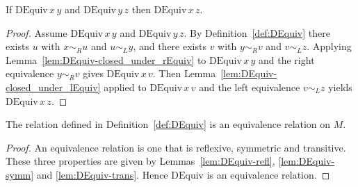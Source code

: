 \begin{lemma}
\label{lem:DEquiv-trans}
If \(\mathrm{DEquiv}\,x\,y\) and \(\mathrm{DEquiv}\,y\,z\) then \(\mathrm{DEquiv}\,x\,z\).
\leanok
{}
\end{lemma}
\begin{proof}
\leanok
Assume \(\mathrm{DEquiv}\,x\,y\) and \(\mathrm{DEquiv}\,y\,z\).  By Definition~\ref{def:DEquiv} there exists \(u\) with \(x \sim_R u\) and \(u \sim_L y\), and there exists \(v\) with \(y \sim_R v\) and \(v \sim_L z\).  Applying Lemma~\ref{lem:DEquiv-closed_under_rEquiv} to \(\mathrm{DEquiv}\,x\,y\) and the right equivalence \(y \sim_R v\) gives \(\mathrm{DEquiv}\,x\,v\).  Then Lemma~\ref{lem:DEquiv-closed_under_lEquiv} applied to \(\mathrm{DEquiv}\,x\,v\) and the left equivalence \(v \sim_L z\) yields \(\mathrm{DEquiv}\,x\,z\).
\end{proof}

\begin{lemma}
\label{lem:DEquiv-isEquiv}
The relation defined in Definition~\ref{def:DEquiv} is an equivalence relation on \(M\).
\leanok
{}
\end{lemma}
\begin{proof}
\leanok
An equivalence relation is one that is reflexive, symmetric and transitive.  These three properties are given by Lemmas~\ref{lem:DEquiv-refl}, \ref{lem:DEquiv-symm} and \ref{lem:DEquiv-trans}.  Hence \(\mathrm{DEquiv}\) is an equivalence relation.
\end{proof}
